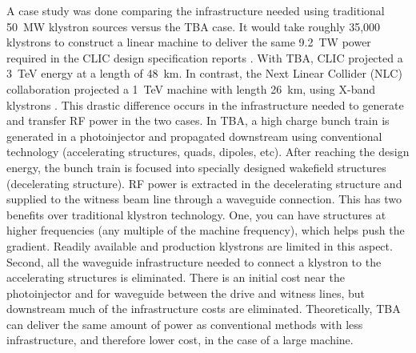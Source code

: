 A case study was done comparing the infrastructure 
needed using traditional \SI{50}{MW} klystron sources versus the TBA case.
It would take roughly 35,000 klystrons to construct a linear machine to deliver the same 
\SI{9.2}{TW} power required in the CLIC design specification reports \cite{CLICdesignReport}. 
With TBA, CLIC projected a \SI{3}{TeV} energy at a length of \SI{48}{km}.
In contrast, the Next Linear Collider (NLC) collaboration projected a \SI{1}{TeV} machine 
with length \SI{26}{km}, using X-band klystrons \cite{NLC}. 
This drastic difference occurs in the infrastructure needed to generate and transfer
RF power in the two cases. In TBA, a high charge bunch train is generated in 
a photoinjector and propagated downstream using conventional technology 
(accelerating structures, quads, dipoles, etc). After reaching the design energy,
the bunch train
is focused into specially designed wakefield structures (decelerating structure).
RF power is extracted in the decelerating structure and supplied to the witness 
beam line through a waveguide connection. This has two benefits over traditional klystron technology.
One, you can have structures at higher frequencies (any multiple of the machine frequency), 
which helps push the gradient. Readily available and production klystrons are limited in this aspect.
Second, all the waveguide infrastructure needed to connect a klystron to the accelerating 
structures is eliminated. There is an initial cost near the photoinjector 
and for waveguide between the drive and witness lines, 
but downstream much of the infrastructure costs are eliminated.
Theoretically, TBA can deliver the same amount of power as conventional methods with less 
infrastructure, and therefore lower cost, in the case of a large machine. 


